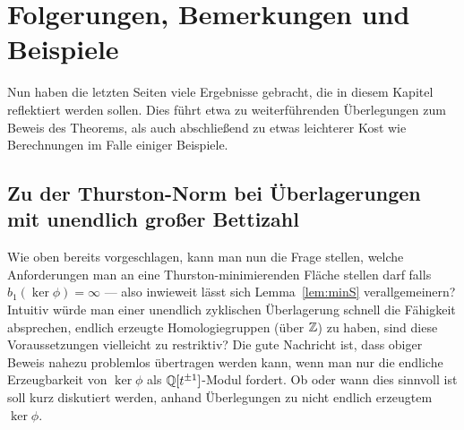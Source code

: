 
\section{Folgerungen, Bemerkungen und Beispiele}
    Nun haben die letzten Seiten viele Ergebnisse gebracht, die in diesem Kapitel reflektiert werden sollen. Dies führt etwa zu weiterführenden Überlegungen zum Beweis des Theorems, als auch abschließend zu etwas leichterer Kost wie Berechnungen im Falle einiger Beispiele.

    \subsection{Zu der Thurston-Norm bei Überlagerungen mit unendlich großer Bettizahl}
        
    \label{verallggruppenring}
    Wie oben bereits vorgeschlagen, kann man nun die Frage stellen, welche Anforderungen man an eine Thurston-minimierenden Fläche stellen darf falls $b_1(\ker\phi)=\infty$ --- also inwieweit lässt sich Lemma~\ref{lem:minS} verallgemeinern? Intuitiv würde man einer unendlich zyklischen Überlagerung schnell die Fähigkeit absprechen, endlich erzeugte Homologiegruppen (über $\mathbb{Z}$) zu haben, sind diese Voraussetzungen vielleicht zu restriktiv? Die gute Nachricht ist, dass obiger Beweis nahezu problemlos übertragen werden kann, wenn man nur die endliche Erzeugbarkeit von $\ker\phi$ als $\mathbb{Q}[t^{\pm 1}]$-Modul fordert. Ob oder wann dies sinnvoll ist soll kurz diskutiert werden, anhand Überlegungen zu nicht endlich erzeugtem $\ker\phi$.

